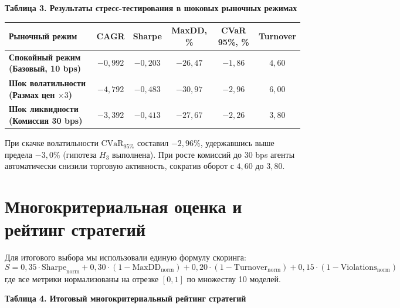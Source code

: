 \documentclass[11pt,a4paper]{article}
\begin{document}
\vspace{0.5em}
\noindent\textbf{Таблица 3. Результаты стресс-тестирования в шоковых рыночных режимах}
\vspace{0.3em}

{\small \setlength{\tabcolsep}{5pt} \renewcommand{\arraystretch}{1.15}
\noindent\begin{tabularx}{\textwidth}{>{\raggedright\arraybackslash}X c c c c c}
\toprule
\textbf{Рыночный режим} & \textbf{CAGR} & \textbf{Sharpe} & \textbf{MaxDD, \%} & \textbf{CVaR 95\%, \%} & \textbf{Turnover} \\
\midrule
\textbf{Спокойный режим (Базовый, 10 bps)} & $-0{,}992$ & $-0{,}203$ & $-26{,}47$ & $-1{,}86$ & $4{,}60$ \\
\textbf{Шок волатильности (Размах цен $\times 3$)} & $-4{,}792$ & $-0{,}483$ & $-30{,}97$ & $-2{,}96$ & $6{,}00$ \\
\textbf{Шок ликвидности (Комиссия 30 bps)} & $-3{,}392$ & $-0{,}413$ & $-27{,}67$ & $-2{,}26$ & $3{,}80$ \\
\bottomrule
\end{tabularx}}

\vspace{0.4em}
При скачке волатильности $\text{CVaR}_{95\%}$ составил $-2{,}96\%$, удержавшись выше предела $-3{,}0\%$ (гипотеза $H_3$ выполнена). При росте комиссий до 30 bps агенты автоматически снизили торговую активность, сократив оборот с $4{,}60$ до $3{,}80$.

\section{Многокритериальная оценка и рейтинг стратегий}

Для итогового выбора мы использовали единую формулу скоринга:
$$S = 0{,}35 \cdot \text{Sharpe}_{\text{norm}} + 0{,}30 \cdot (1 - \text{MaxDD}_{\text{norm}}) + 0{,}20 \cdot (1 - \text{Turnover}_{\text{norm}}) + 0{,}15 \cdot (1 - \text{Violations}_{\text{norm}})$$
где все метрики нормализованы на отрезке $[0, 1]$ по множеству 10 моделей.

\vspace{0.5em}
\noindent\textbf{Таблица 4. Итоговый многокритериальный рейтинг стратегий}
\vspace{0.3em}
\end{document}
